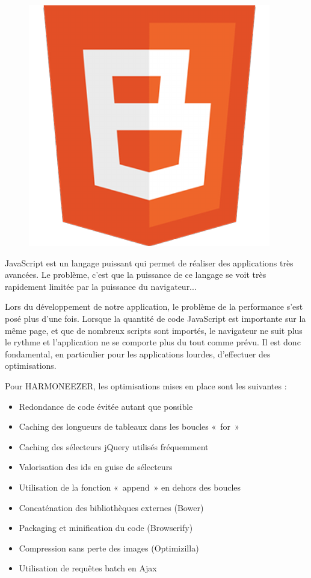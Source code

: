 \documentclass[a4paper,12pt]{article}
\begin{document}
\begin{figure}[!h]
  \begin{center}
    \includegraphics[scale=0.2]{logo-benchmarkjs.png}
  \end{center}
\end{figure}

JavaScript est un langage puissant qui permet de réaliser des applications très avancées. Le problème, c'est que la puissance de ce langage se voit très rapidement limitée par la puissance du navigateur...

Lors du développement de notre application, le problème de la performance s'est posé plus d'une fois. Lorsque la quantité de code JavaScript est importante sur la même page, et que de nombreux scripts sont importés, le navigateur ne suit plus le rythme et l'application ne se comporte plus du tout comme prévu. Il est donc fondamental, en particulier pour les applications lourdes, d'effectuer des optimisations.

Pour HARMONEEZER, les optimisations mises en place sont les suivantes :

\begin{itemize}
 \item{Redondance de code évitée autant que possible}
 \item{Caching des longueurs de tableaux dans les boucles «~for~»}
 \item{Caching des sélecteurs jQuery utilisés fréquemment}
 \item{Valorisation des ids en guise de sélecteurs}
 \item{Utilisation de la fonction «~append~» en dehors des boucles}
 \item{Concaténation des bibliothèques externes (Bower)}
 \item{Packaging et minification du code (Browserify)}
 \item{Compression sans perte des images (Optimizilla)}
 \item{Utilisation de requêtes batch en Ajax}
\end{itemize}
\end{document}
